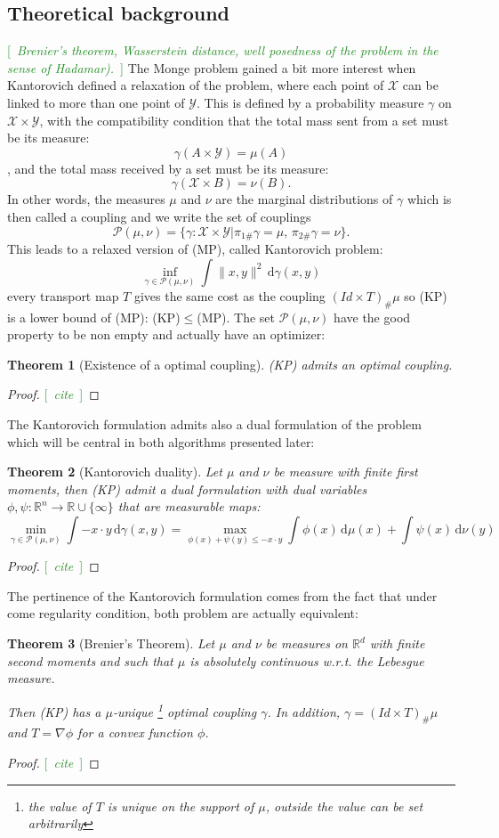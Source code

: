 \documentclass[a4paper]{article}
\newtheorem{theoreme}{Theorem} %
\theoremstyle{definition}
\theoremstyle{remark}
\newcommand{\dd}{\,\mathrm{d}}
\newcommand{\R}{\mathbb{R}}
\newcommand{\X}{\mathcal{X}}
\newcommand{\Y}{\mathcal{Y}}
\newcommand{\com}[1]{\textcolor{ForestGreen}{[~\emph{#1}~]}}
\begin{document}
\subsection{Theoretical background} \com{Brenier’s theorem, Wasserstein distance, well posedness of the problem in the sense of Hadamar).}
The Monge problem gained a bit more interest when Kantorovich defined a relaxation of the problem, where each point of $\X$ can be linked to more than one point of $\Y$. This is defined by a probability measure $\gamma$ on $\X\times\Y$, with the compatibility condition that the total mass sent from a set must be its measure:
$$\gamma(A\times \Y) = \mu(A)$$ 
, and the total mass received by a set must be its measure:
$$\gamma(\X\times B) = \nu(B).$$
In other words, the measures $\mu$ and $\nu$ are the marginal distributions of $\gamma$ which is then called a coupling and we write the set of couplings $$\mathcal{P}(\mu,\nu)=\{\gamma:\X\times\Y | \pi_{1\#}\gamma=\mu,\,\pi_{2\#}\gamma=\nu\} .$$
This leads to a relaxed version of (MP), called Kantorovich problem:
\[\inf_{\gamma\in\mathcal{P}(\mu,\nu)} \int \|x,y\|^2\dd\gamma(x,y) \label{eq:KP} \tag{KP} \]
every transport map $T$ gives the same cost as the coupling $(Id\times T)_{\#}\mu$ so (KP) is a lower bound of (MP): (KP)$\leq$(MP). The set $\mathcal{P}(\mu,\nu)$ have the good property to be non empty and actually have an optimizer:
\begin{theoreme}[Existence of a optimal coupling]
    (KP) admits an optimal coupling.
\end{theoreme}
\begin{proof} \com{cite}\end{proof}
The Kantorovich formulation admits also a dual formulation of the problem which will be central in both algorithms presented later:
\begin{theoreme}[Kantorovich duality]
    Let $\mu$ and $\nu$ be measure with finite first moments, then (KP) admit a dual formulation with dual variables $ \phi,\psi:\R^n\to\R\cup \{\infty\}$ that are measurable maps:
   \[ \min_{\gamma\in\mathcal{P}(\mu,\nu)} \int -x\cdot y \dd\gamma(x,y)
   = \max_{\phi(x) +\psi(y) \leq - x\cdot y} \int \phi(x)\dd\mu(x) + \int \psi(x)\dd\nu(y)
   \label{eq:KD} \tag{KD} \]
\end{theoreme}
\begin{proof} \com{cite}\end{proof}
 The pertinence of the Kantorovich formulation comes from the fact that under come regularity condition, both problem are actually equivalent:
 \begin{theoreme}[Brenier's Theorem] \label{thm:brenier}
    Let $\mu$ and $\nu$ be measures on $\R^d$ with finite second moments and such that $\mu$ is absolutely continuous w.r.t. the Lebesgue measure.
    
    Then (KP) has a $\mu$-unique \footnote{the value of $T$ is unique on the support of $\mu$, outside the value can be set arbitrarily} optimal coupling $\gamma$. In addition, $\gamma=(Id\times T)_{\#}\mu$ and $T=\nabla\phi$ for a convex function $\phi$.
\end{theoreme}
\begin{proof} \com{cite}\end{proof}
\end{document}
